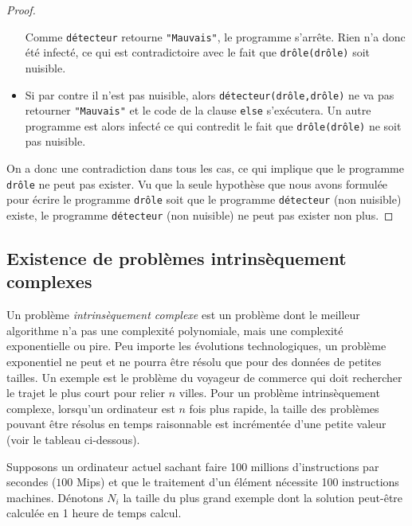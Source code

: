 \begin{proof}
\begin{itemize}
      Comme \lstinline|détecteur| retourne \lstinline|"Mauvais"|,
      le programme s'arrête.
      Rien n'a donc été infecté, ce qui est contradictoire avec le fait que \lstinline|drôle(drôle)| soit nuisible.
	\item Si par contre il n'est pas nuisible, alors \lstinline|détecteur(drôle,drôle)|
      ne va pas retourner \lstinline|"Mauvais"| et le code de la clause \lstinline|else| s'exécutera.
      Un autre programme est alors infecté ce qui contredit le fait que \lstinline|drôle(drôle)| ne soit pas nuisible.
\end{itemize}

On a donc une contradiction dans tous les cas, ce qui implique que le programme \lstinline|drôle| ne peut pas
exister. Vu que la seule hypothèse que nous avons formulée pour écrire le programme \lstinline|drôle| soit que le programme \lstinline|détecteur| (non nuisible) existe,
le programme \lstinline|détecteur| (non nuisible) ne peut pas exister non plus.

\end{proof}

\subsection{Existence de problèmes intrinsèquement complexes}
\label{subsec:existence_de_problemes_intrinsequement_complexes}

\begin{mydef}
	Un problème \emph{intrinsèquement complexe} est un problème dont le meilleur algorithme n'a pas une complexité polynomiale, mais une complexité exponentielle ou pire. Peu importe les évolutions technologiques, un problème exponentiel ne peut et ne pourra être résolu que pour des données de petites tailles.  Un exemple est le problème du voyageur de commerce qui doit rechercher le trajet le plus court pour relier $n$ villes. Pour un problème intrinsèquement complexe, lorsqu'un ordinateur est $n$ fois plus rapide, la taille des problèmes pouvant être résolus en temps raisonnable est incrémentée d'une petite valeur (voir le tableau ci-dessous).
\end{mydef}

Supposons un ordinateur actuel sachant faire 100 millions d'instructions par secondes ($100$ Mips) et que le traitement d'un élément nécessite 100 instructions machines. Dénotons $N_i$  la taille du \og plus grand\fg{} exemple dont la solution peut-être calculée en 1 heure de temps calcul.

